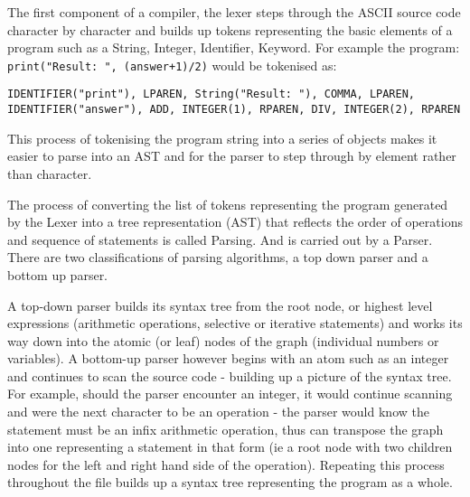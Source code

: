 \bigskip

\bigskip

The first component of a compiler, the lexer steps through the ASCII source code character by character and builds up tokens representing the basic elements of a program such as a String, Integer, Identifier, Keyword. For example the program: \texttt{print("Result: ", (answer+1)/2)} would be tokenised as:

\begin{lstlisting}
IDENTIFIER("print"), LPAREN, String("Result: "), COMMA, LPAREN, IDENTIFIER("answer"), ADD, INTEGER(1), RPAREN, DIV, INTEGER(2), RPAREN
\end{lstlisting}

This process of tokenising the program string into a series of objects makes it easier to parse into an AST and for the parser to step through by element rather than character.

The process of converting the list of tokens representing the program generated by the Lexer into a tree representation (AST) that reflects the order of operations and sequence of statements is called Parsing. And is carried out by a Parser. There are two classifications of parsing algorithms, a top down parser and a bottom up parser.

A top-down parser builds its syntax tree from the root node, or highest level expressions (arithmetic operations, selective or iterative statements) and works its way down into the atomic (or leaf) nodes of the graph (individual numbers or variables). A bottom-up parser however begins with an atom such as an integer and continues to scan the source code - building up a picture of the syntax tree. For example, should the parser encounter an integer, it would continue scanning and were the next character to be an operation - the parser would know the statement must be an infix arithmetic operation, thus can transpose the graph into one representing a statement in that form (ie a root node with two children nodes for the left and right hand side of the operation). Repeating this process throughout the file builds up a syntax tree representing the program as a whole.

